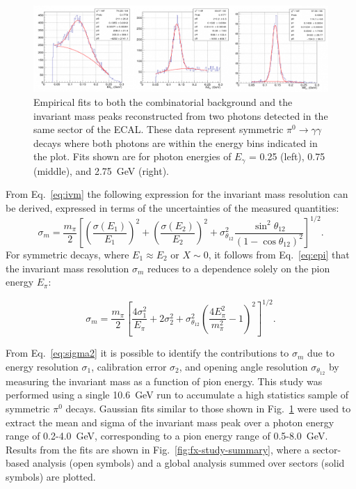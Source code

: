 \begin{figure}[h]
\centering
\includegraphics[width=1.0\columnwidth,keepaspectratio]{img/fx-pi0-fits.png}
\caption[]{Empirical fits to both the combinatorial background and the invariant mass peaks reconstructed from two
  photons detected in the same sector of the ECAL. These data represent symmetric
  $\pi^0 \rightarrow \gamma \gamma$ decays where both photons are within the energy bins indicated in the plot.
  Fits shown are for photon energies of $E_{\gamma}$ = 0.25 (left), 0.75 (middle), and 2.75~GeV (right).}
\label{fig:fx-pi0-fits}
\end{figure}

From Eq.~\ref{eq:ivm} the following expression for the invariant mass resolution can be derived, expressed in terms of the uncertainties of the measured quantities:
\begin{equation}
  \sigma_m  = \frac{m_{\pi}}{2}\left[\left(\frac{\sigma(E_1)}{E_1}\right)^2 + \left(\frac{\sigma(E_2)}{E_2}\right)^2
    + \sigma^2_{\theta_{12}}\frac{\sin^2 \theta_{12}}{(1-\cos \theta_{12})^2}\right]^{1/2}.
\label{eq:sigmam1}
\end{equation}
For symmetric decays, where $E_1 \approx E_2$ or $X\sim 0$, it follows from Eq.~\ref{eq:epi} that the invariant mass resolution $\sigma_m$
reduces to a dependence solely on the pion energy $E_{\pi}$:

\begin{equation}
  \sigma_m = \frac{m_{\pi}}{2}\left[\frac{4 \sigma^2_1}{E_{\pi}} + 2 \sigma^2_2 +
    \sigma^2_{\theta_{12}}\left(\frac{4 E^2_{\pi}}{m^2_{\pi}}-1\right)^2\right]^{1/2}.
\label{eq:sigma2}
\end{equation}

From Eq.~\ref{eq:sigma2} it is possible to identify the contributions to $\sigma_m$ due to energy resolution
$\sigma_1$, calibration error $\sigma_2$, and opening angle resolution $\sigma_{\theta_{12}}$ by measuring the
invariant mass as a function of pion energy. This study was performed using a single 10.6~GeV run to accumulate
a high statistics sample of symmetric $\pi^{0}$ decays. Gaussian fits similar to those shown in
Fig.~\ref{fig:fx-pi0-fits} were used to extract the mean and sigma of the invariant mass peak over a photon energy
range of 0.2-4.0~GeV, corresponding to a pion energy range of 0.5-8.0~GeV. Results from the fits are shown in
Fig.~\ref{fig:fx-study-summary}, where a sector-based analysis (open symbols) and a global analysis summed over
sectors (solid symbols) are plotted.  

